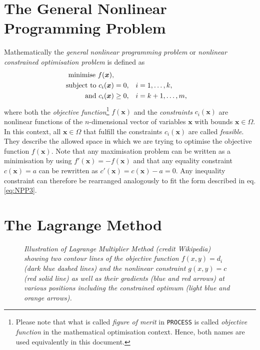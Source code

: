 \documentclass[11pt,a4paper]{report}
\newcommand{\process}{\mbox{\texttt{PROCESS}}}
\renewcommand{\vec}[1]{\boldsymbol{#1}}
\begin{document}
\section{The General Nonlinear Programming Problem}
\label{sec:GNPP}
Mathematically the {\it general nonlinear programming problem} or {\it
  nonlinear constrained optimisation problem} is defined as
\begin{subequations}
\label{eq:NPP}
\begin{align}
\textnormal{minimise } f(\vec{x}), & \\
\textnormal{subject to } c_i(\vec{x}) &= 0, & i&=1,\dots,k,\\
\label{eq:NPP3}
\textnormal{and } c_i(\vec{x}) &\geq 0, & i&=k+1,\dots,m,
\end{align}
\end{subequations}
where both the {\it objective function}\footnote{Please note that what is
  called {\it figure of merit} in \process\/ is called {\it objective
    function} in the mathematical optimisation context. Hence, both names are
  used equivalently in this document.} $f(\vec{x})$ and the {\it constraints}
$c_i(\vec{x})$ are nonlinear functions of the $n$-dimensional vector of
variables $\vec{x}$ with bounds $\vec{x} \in \Omega$. In this context, all
$\vec{x}\in\Omega$ that fulfill the constraints $c_i(\vec{x})$ are called {\it
  feasible}. They describe the allowed space in which we are trying to
optimise the objective function $f(\vec{x})$. Note that any maximisation
problem can be written as a minimisation by using $f'(\vec{x}) = - f(\vec{x})$
and that any equality constraint $c(\vec{x}) = a$ can be rewritten as
$c'(\vec{x}) = c(\vec{x}) - a = 0$. Any inequality constraint can therefore be
rearranged analogously to fit the form described in eq. \ref{eq:NPP3}.

\section{The Lagrange Method}
\label{sec:Lagrange}

\begin{figure}[tbph]
\caption[Illustration of Lagrange multiplier method]
{\label{fig:LagrangeMultipliers} \textit{Illustration of Lagrange Multiplier
    Method (credit Wikipedia) showing two contour lines of the objective
    function $f(x,y) = d_i$ (dark blue dashed lines) and the nonlinear
    constraint $g(x,y)=c$ (red solid line) as well as their gradients (blue
    and red arrows) at various positions including the constrained optimum
    (light blue and orange arrows).}
}
\end{figure}
\end{document}
